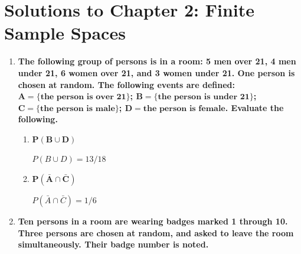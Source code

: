 \documentclass[10pt, oneside]{article}
\begin{document}
\newpage


\setcounter{cor}{0}
\setcounter{prop}{0}
\setcounter{cor*}{0}

{}
\section*{Solutions to Chapter 2: Finite Sample Spaces}

\begin{enumerate}[label=2.\arabic*]
\itemsep0em 
\item  \begin{tcolorbox}[
  colback=Cerulean!5!white,
  colframe=Cerulean!75!black]
\textbf{The following group of persons is in a room: 5 men over 21, 4 men under 21, 6 women over 21, and 3 women under 21. One person is chosen at random. The following events are defined: $\bm{A = \{\text{the person is over 21} \}}$; $\bm{B = \{ \text{the person is under 21} \}}$; $\bm{C = \{ \text{the person is male} \}}$; $\bm{D = \text{the person is female}}$. Evaluate the following.}
\end{tcolorbox}

	\begin{enumerate}
	\item \begin{tcolorbox}[
  colback=Cerulean!5!white,
  colframe=Cerulean!75!black]
  $\bm{P(B \cup D)}$
  \end{tcolorbox}
	
	$P(B \cup D) = \boxed{13/18}$
	
	\item \begin{tcolorbox}[
  colback=Cerulean!5!white,
  colframe=Cerulean!75!black]
	$\bm{P(\bar{A} \cap \bar{C})}$
	\end{tcolorbox}
	
	$P(\bar{A} \cap \bar{C}) = \boxed{1/6}$
	
	\end{enumerate}
	
\item \begin{tcolorbox}[
  colback=Cerulean!5!white,
  colframe=Cerulean!75!black]
\textbf{Ten persons in a room are wearing badges marked 1 through 10. Three persons are chosen at random, and asked to leave the room simultaneously. Their badge number is noted.}
\end{tcolorbox}


\end{enumerate}
\end{document}
